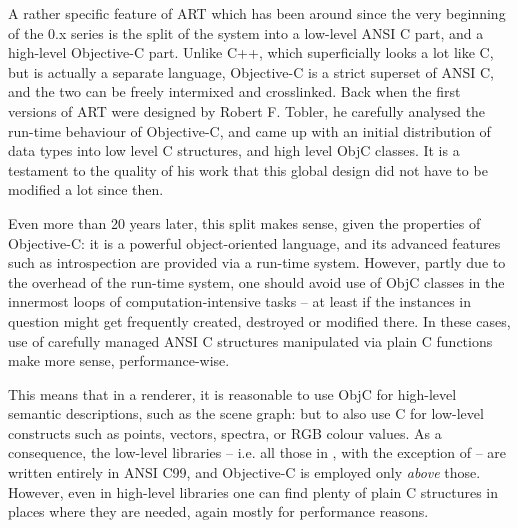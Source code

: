 A rather specific feature of ART which has been around since the very beginning of the 0.x series is the split of the system into a low-level ANSI C part, and a high-level Objective-C part. Unlike C++, which superficially looks a lot like C, but is actually a separate language, Objective-C is a strict superset of ANSI C, and the two can be freely intermixed and crosslinked. Back when the first versions of ART were designed by Robert F. Tobler, he carefully analysed the run-time behaviour of Objective-C, and came up with an initial distribution of data types into low level C structures, and high level ObjC classes. It is a testament to the quality of his work that this global design did not have to be modified a lot since then.

Even more than 20 years later, this split makes sense, given the properties of Objective-C: it is a powerful object-oriented language, and its advanced features such as introspection are provided via a run-time system. However, partly due to the overhead of the run-time system, one should avoid use of ObjC classes in the innermost loops of computation-intensive tasks -- at least if the instances in question might get frequently created, destroyed or modified there. In these cases, use of carefully managed ANSI C structures mani\-pulated via plain C functions make more sense, performance-wise. 

This means that in a renderer, it is reasonable to use ObjC for high-level semantic descriptions, such as the scene graph: but to also use C for low-level constructs such as points, vectors, spectra, or RGB colour values. As a consequence, the low-level libraries -- i.e. all those in , with the exception of  -- are written entirely in ANSI C99, and Objective-C is employed only \emph{above} those. However, even in high-level libraries one can find plenty of plain C structures in places where they are needed, again mostly for performance reasons.


